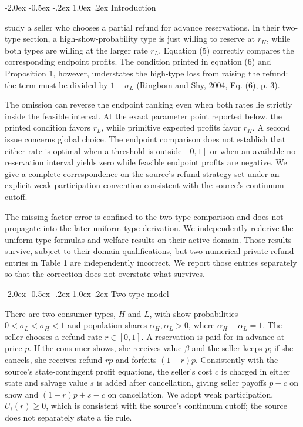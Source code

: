 \documentclass[12pt]{article}
\makeatletter
\renewcommand\section{\@startsection{section}{1}{\z@}%
  {-2.0ex \@plus -0.5ex \@minus -.2ex}%
  {1.0ex \@plus .2ex}%
  {\centering\normalfont\bfseries\fontsize{14}{16}\selectfont}}
\makeatother
\begin{document}
\section{Introduction}

\citet{ringbomShy2004} study a seller who chooses a partial refund for advance reservations. In their two-type section, a high-show-probability type is just willing to reserve at $r_H$, while both types are willing at the larger rate $r_L$. Equation (5) correctly compares the corresponding endpoint profits. The condition printed in equation (6) and Proposition 1, however, understates the high-type loss from raising the refund: the term must be divided by $1-\sigma_L$ (Ringbom and Shy, 2004, Eq. (6), p. 3).

The omission can reverse the endpoint ranking even when both rates lie strictly inside the feasible interval. At the exact parameter point reported below, the printed condition favors $r_L$, while primitive expected profits favor $r_H$. A second issue concerns global choice. The endpoint comparison does not establish that either rate is optimal when a threshold is outside $[0,1]$ or when an available no-reservation interval yields zero while feasible endpoint profits are negative. We give a complete correspondence on the source's refund strategy set under an explicit weak-participation convention consistent with the source's continuum cutoff.

The missing-factor error is confined to the two-type comparison and does not propagate into the later uniform-type derivation. We independently rederive the uniform-type formulas and welfare results on their active domain. Those results survive, subject to their domain qualifications, but two numerical private-refund entries in Table 1 are independently incorrect. We report those entries separately so that the correction does not overstate what survives.

\section{Two-type model}

There are two consumer types, $H$ and $L$, with show probabilities $0<\sigma_L<\sigma_H<1$ and population shares $\alpha_H,\alpha_L>0$, where $\alpha_H+\alpha_L=1$. The seller chooses a refund rate $r\in[0,1]$. A reservation is paid for in advance at price $p$. If the consumer shows, she receives value $\beta$ and the seller keeps $p$; if she cancels, she receives refund $rp$ and forfeits $(1-r)p$. Consistently with the source's state-contingent profit equations, the seller's cost $c$ is charged in either state and salvage value $s$ is added after cancellation, giving seller payoffs $p-c$ on show and $(1-r)p+s-c$ on cancellation. We adopt weak participation, $U_i(r)\geq0$, which is consistent with the source's continuum cutoff; the source does not separately state a tie rule.
\end{document}
